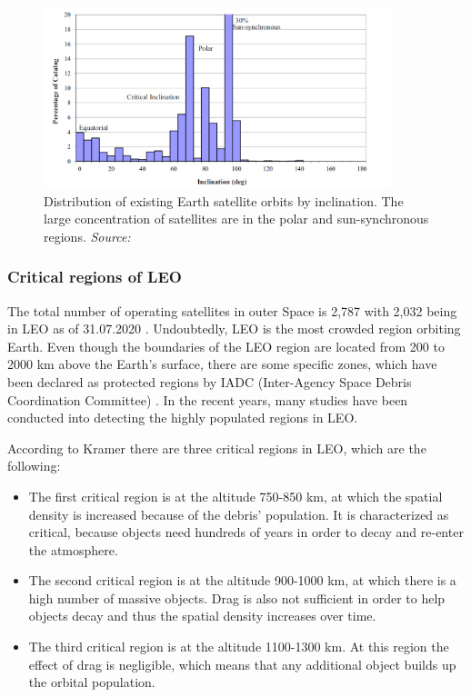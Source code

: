 \begin{figure}
\centering
\includegraphics[width=0.9\textwidth]{Images/inclination-satellites.png}\caption{Distribution of existing Earth satellite orbits by inclination. The large concentration of satellites are in the polar and sun-synchronous regions. \textit{Source: \cite{Vallado}}}
\label{inclination-satellites} 
\end{figure}

\bigskip
\subsubsection{Critical regions of LEO}
\bigskip

The total number of operating satellites in outer Space is 2,787 with 2,032 being in LEO as of 31.07.2020 \cite{UCS}. Undoubtedly, LEO is the most crowded region orbiting Earth. Even though the boundaries of the LEO region are located from 200 to 2000 km above the Earth's surface, there are some specific zones, which have been declared as protected regions by IADC (Inter-Agency Space Debris Coordination Committee) \cite{IADC 2007}. In the recent years, many studies have been conducted into detecting the highly populated regions in LEO.

According to Kramer \cite{Kramer 2002} there are three critical regions in LEO, which are the following:
\begin{itemize}
\item The first critical region is at the altitude 750-850 km, at which the spatial density is increased because of the debris' population. It is characterized as critical, because objects need hundreds of years in order to decay and re-enter the atmosphere.
\item The second critical region is at the altitude 900-1000 km, at which there is a high number of massive objects. Drag is also not sufficient in order to help objects decay and thus the spatial density increases over time.
\item The third critical region is at the altitude 1100-1300 km. At this region the effect of drag is negligible, which means that any additional object builds up the orbital population.
\end{itemize}

